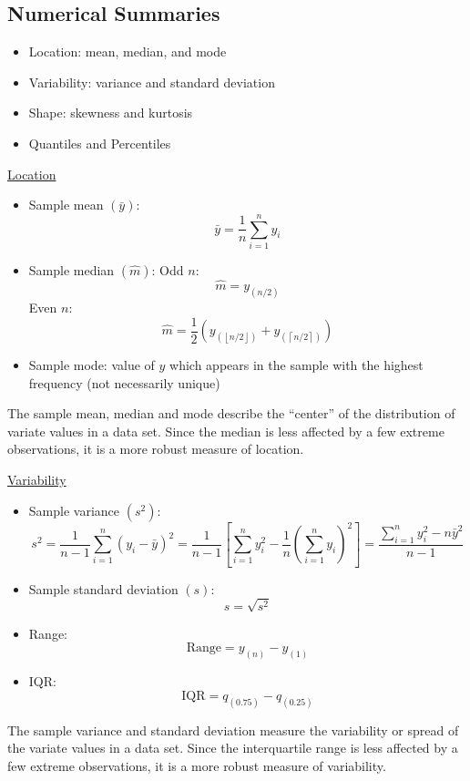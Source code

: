 \subsection{Numerical Summaries}

\begin{itemize}
    \item Location: mean, median, and mode
    \item Variability: variance and standard deviation
    \item Shape: skewness and kurtosis
    \item Quantiles and Percentiles
\end{itemize}

\underline{Location}
\begin{itemize}
    \item Sample mean $ \left( \bar{y} \right) $:
          \[ \bar{y}=\frac{1}{n} \sum_{i=1}^{n} y_{i} \]
    \item Sample median $ \left( \hat{m} \right) $:
          \subitem Odd $ n $:
          \[ \hat{m}=y_{\left(n/2\right)} \]
          \subitem Even $ n $:
          \[ \hat{m}=\frac{1}{2} \left( y_{\left(\left\lfloor n/2\right\rfloor\right)} +
              y_{\left(\left\lceil n/2\right\rceil\right)}\right) \]
    \item Sample mode: value of $ y $ which appears in the sample with the highest frequency
          (not necessarily unique)
\end{itemize}
The sample mean, median and mode describe the ``center'' of the distribution
of variate values in a data set. Since the median is less affected by a few extreme
observations, it is a more robust measure of location.

\underline{Variability}
\begin{itemize}
    \item Sample variance $ \left( s^2 \right) $:
          \[ s^{2}=\frac{1}{n-1} \sum_{i=1}^{n}\left(y_{i}-\bar{y}\right)^{2}
              =\frac{1}{n-1}\left[\sum_{i=1}^{n} y_{i}^{2}-\frac{1}{n}
                  \left(\sum_{i=1}^{n} y_{i}\right)^{2}\right]
              =\frac{\sum_{i=1}^{n} y_{i}^{2}-n \bar{y}^{2}}{n-1} \]
    \item Sample standard deviation $ \left( s \right) $:
          \[ s=\sqrt{s^2} \]
    \item Range:
          \[ \text{Range}=y_{(n)}-y_{(1)} \]
    \item IQR:
          \[ \text{IQR}=q_{(0.75)}-q_{(0.25)} \]
\end{itemize}
The sample variance and standard deviation measure the variability or spread of the
variate values in a data set. Since the interquartile range is less affected
by a few extreme observations, it is a more robust measure of variability.

